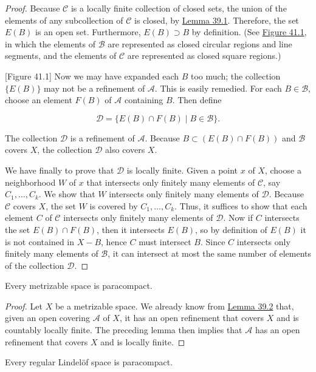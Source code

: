 \begin{proof}
Because \(\mathcal{C}\) is a locally finite collection of closed sets, the union of the elements of any subcollection of \(\mathcal{C}\) is closed, by \hyperref[lem:39.1]{Lemma 39.1}. Therefore, the set \(E(B)\) is an open set. Furthermore, \(E(B) \supset B\) by definition. (See \hyperref[fig:41.1]{Figure 41.1}, in which the elements of \(\mathcal{B}\) are represented as closed circular regions and line segments, and the elements of \(\mathcal{C}\) are represented as closed square regions.)

[Figure 41.1]
Now we may have expanded each \(B\) too much; the collection \(\{ E(B) \}\) may not be a refinement of \(\mathcal{A}\). This is easily remedied. For each \(B \in \mathcal{B}\), choose an element \(F(B)\) of \(\mathcal{A}\) containing \(B\). Then define

\[
\mathcal{D} = \{ E(B) \cap F(B) \mid B \in \mathcal{B}\}.
\]

The collection \(\mathcal{D}\) is a refinement of \(\mathcal{A}\). Because \(B \subset ({E(B) \cap F(B) })\) and \(\mathcal{B}\) covers \(X\), the collection \(\mathcal{D}\) also covers \(X\).

We have finally to prove that \(\mathcal{D}\) is locally finite. Given a point \(x\) of \(X\), choose a neighborhood \(W\) of \(x\) that intersects only finitely many elements of \(\mathcal{C}\), say \(C_{1},\ldots ,C_{k}\). We show that \(W\) intersects only finitely many elements of \(\mathcal{D}\). Because \(\mathcal{C}\) covers \(X\), the set \(W\) is covered by \(C_{1},\ldots ,C_{k}\). Thus, it suffices to show that each element \(C\) of \(\mathcal{C}\) intersects only finitely many elements of \(\mathcal{D}\). Now if \(C\) intersects the set \(E(B) \cap F(B)\), then it intersects \(E(B)\), so by definition of \(E(B)\) it is not contained in \(X - B\), hence \(C\) must intersect \(B\). Since \(C\) intersects only finitely many elements of \(\mathcal{B}\), it can intersect at most the same number of elements of the collection \(\mathcal{D}\).
\end{proof}
\begin{theorem}
\label{thm:\thetheorem}
 Every metrizable space is paracompact.
\end{theorem}

\begin{proof}
 Let \(X\) be a metrizable space. We already know from \hyperref[lem:39.2]{Lemma 39.2} that, given an open covering \(\mathcal{A}\) of \(X\), it has an open refinement that covers \(X\) and is countably locally finite. The preceding lemma then implies that \(\mathcal{A}\) has an open refinement that covers \(X\) and is locally finite.
\end{proof}
\begin{theorem}
\label{thm:\thetheorem}
 Every regular Lindelöf space is paracompact.
\end{theorem}

